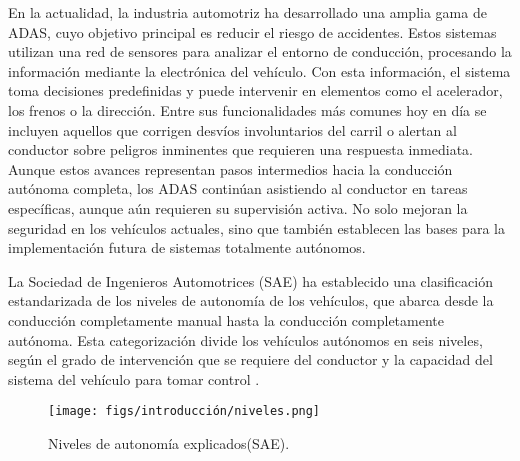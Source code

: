 En la actualidad, la industria automotriz ha desarrollado una amplia gama de \ac{ADAS}, cuyo objetivo principal es reducir el riesgo de accidentes. Estos sistemas utilizan una red de sensores para analizar el entorno de conducción, procesando la información mediante la electrónica del vehículo. Con esta información, el sistema toma decisiones predefinidas y puede intervenir en elementos como el acelerador, los frenos o la dirección. Entre sus funcionalidades más comunes hoy en día se incluyen aquellos que corrigen desvíos involuntarios del carril o alertan al conductor sobre peligros inminentes que requieren una respuesta inmediata. Aunque estos avances representan pasos intermedios hacia la conducción autónoma completa, los \ac{ADAS} continúan asistiendo al conductor en tareas específicas, aunque aún requieren su supervisión activa. No solo mejoran la seguridad en los vehículos actuales, sino que también establecen las bases para la implementación futura de sistemas totalmente autónomos.

La Sociedad de Ingenieros Automotrices (\ac{SAE}) ha establecido una clasificación estandarizada de los niveles de autonomía de los vehículos, que abarca desde la conducción completamente manual hasta la conducción completamente autónoma. Esta categorización divide los vehículos autónomos en seis niveles, según el grado de intervención que se requiere del conductor y la capacidad del sistema del vehículo para tomar control \cite{autobild-autonomous}.

\begin{figure} [ht]
  \begin{center}
    \texttt{[image: figs/introducción/niveles.png]}
  \end{center}
  \caption{Niveles de autonomía explicados(\ac{SAE}).}
  \label{aut-levels}
  \end{figure}

